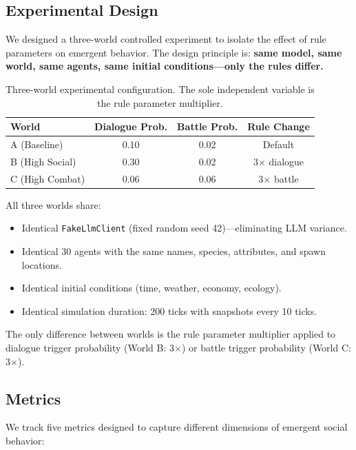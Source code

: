 \documentclass[11pt]{article}
\begin{document}
\subsection{Experimental Design}

We designed a three-world controlled experiment to isolate the effect of rule parameters on emergent behavior.
The design principle is: \textbf{same model, same world, same agents, same initial conditions---only the rules differ.}

\begin{table}[H]
\centering
\caption{Three-world experimental configuration. The sole independent variable is the rule parameter multiplier.}
\label{tab:worlds}
\begin{tabular}{l c c c}
\toprule
\textbf{World} & \textbf{Dialogue Prob.} & \textbf{Battle Prob.} & \textbf{Rule Change} \\
\midrule
A (Baseline) & 0.10 & 0.02 & Default \\
B (High Social) & 0.30 & 0.02 & 3$\times$ dialogue \\
C (High Combat) & 0.06 & 0.06 & 3$\times$ battle \\
\bottomrule
\end{tabular}
\end{table}

All three worlds share:
\begin{itemize}[leftmargin=*,nosep]
    \item Identical \texttt{FakeLlmClient} (fixed random seed 42)---eliminating LLM variance.
    \item Identical 30 agents with the same names, species, attributes, and spawn locations.
    \item Identical initial conditions (time, weather, economy, ecology).
    \item Identical simulation duration: 200 ticks with snapshots every 10 ticks.
\end{itemize}

The only difference between worlds is the rule parameter multiplier applied to dialogue trigger probability (World B: 3$\times$) or battle trigger probability (World C: 3$\times$).

\subsection{Metrics}

We track five metrics designed to capture different dimensions of emergent social behavior:
\end{document}
